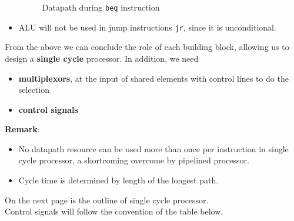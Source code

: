 \documentclass[12pt]{article}
\theoremstyle{definition}
\begin{document}
\begin{itemize}
\begin{figure}[h]
\caption{Datapath during \texttt{beq} instruction}
\end{figure}
\item ALU will not be used in jump instructions \texttt{jr}, since it is unconditional.
\end{itemize}
\clearpage
From the above we can conclude the role of each building block, allowing us to design a \textbf{single cycle} processor. In addition, we need 
\begin{itemize}
  \item \textbf{multiplexors}, at the input of shared elements with control lines to do the selection
  \item \textbf{control signals}
\end{itemize}
\textbf{Remark}: \\
\begin{itemize}
\item No datapath resource can be used more than once per instruction in single cycle processor, a shortcoming overcome by pipelined processor.
\item Cycle time is determined by length of the longest path.
\end{itemize}
On the next page is the outline of single cycle processor.\\
Control signals will follow the convention of the table below.
\end{document}
